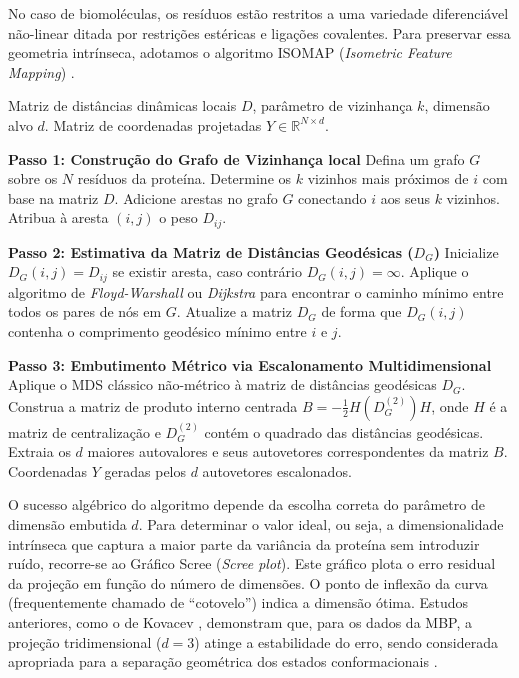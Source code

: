 \documentclass[12pt, a4paper]{article}
\theoremstyle{plain}
\theoremstyle{definition}
\theoremstyle{remark}
\newcommand{\ident}{\hspace{2em}}
\begin{document}
\ident No caso de biomoléculas, os resíduos estão restritos a uma variedade diferenciável não-linear ditada por restrições estéricas e ligações covalentes. Para preservar essa geometria intrínseca, adotamos o algoritmo ISOMAP (\textit{Isometric Feature Mapping}) \cite{Tenenbaum2000}.

\begin{algorithm}[H]
\caption{Mapeamento Isométrico de Características (ISOMAP)}
\label{alg:isomap}
\linespread{1.3}\selectfont
\begin{algorithmic}[1]
\Require Matriz de distâncias dinâmicas locais $D$, parâmetro de vizinhança $k$, dimensão alvo $d$.
\Ensure Matriz de coordenadas projetadas $Y \in \mathbb{R}^{N \times d}$.

\Statex \textbf{Passo 1: Construção do Grafo de Vizinhança local}
\State Defina um grafo $G$ sobre os $N$ resíduos da proteína.
    \State Determine os $k$ vizinhos mais próximos de $i$ com base na matriz $D$.
    \State Adicione arestas no grafo $G$ conectando $i$ aos seus $k$ vizinhos.
    \State Atribua à aresta $(i,j)$ o peso $D_{ij}$.
\EndFor

\Statex \textbf{Passo 2: Estimativa da Matriz de Distâncias Geodésicas ($D_G$)}
\State Inicialize $D_G(i,j) = D_{ij}$ se existir aresta, caso contrário $D_G(i,j) = \infty$.
\State Aplique o algoritmo de \textit{Floyd-Warshall} ou \textit{Dijkstra} para encontrar o caminho mínimo entre todos os pares de nós em $G$.
\State Atualize a matriz $D_G$ de forma que $D_G(i,j)$ contenha o comprimento geodésico mínimo entre $i$ e $j$.

\Statex \textbf{Passo 3: Embutimento Métrico via Escalonamento Multidimensional}
\State Aplique o MDS clássico não-métrico à matriz de distâncias geodésicas $D_G$.
\State Construa a matriz de produto interno centrada $B = -\frac{1}{2} H (D_G^{(2)}) H$, onde $H$ é a matriz de centralização e $D_G^{(2)}$ contém o quadrado das distâncias geodésicas.
\State Extraia os $d$ maiores autovalores e seus autovetores correspondentes da matriz $B$.
\State \Return Coordenadas $Y$ geradas pelos $d$ autovetores escalonados.
\end{algorithmic}
\end{algorithm}

\ident O sucesso algébrico do algoritmo depende da escolha correta do parâmetro de dimensão embutida $d$. Para determinar o valor ideal, ou seja, a dimensionalidade intrínseca que captura a maior parte da variância da proteína sem introduzir ruído, recorre-se ao Gráfico Scree (\textit{Scree plot}). Este gráfico plota o erro residual da projeção em função do número de dimensões. O ponto de inflexão da curva (frequentemente chamado de \enquote{cotovelo}) indica a dimensão ótima. Estudos anteriores, como o de Kovacev \cite{kovacev2016}, demonstram que, para os dados da MBP, a projeção tridimensional ($d=3$) atinge a estabilidade do erro, sendo considerada apropriada para a separação geométrica dos estados conformacionais \cite{kovacev2016}.
\end{document}
